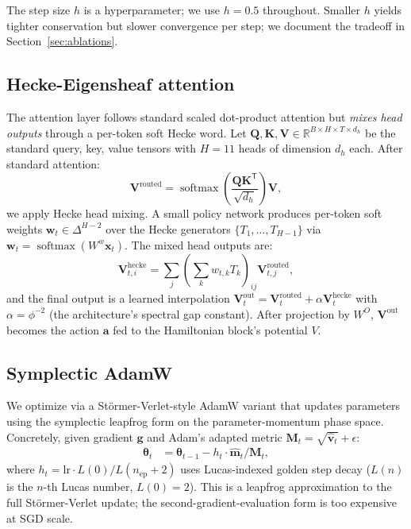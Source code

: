 \documentclass[11pt]{article}
\newcommand{\R}{\mathbb{R}}
\newcommand{\T}{\mathsf{T}}
\newcommand{\phigold}{\phi}
\DeclareMathOperator{\softmax}{softmax}
\begin{document}
The step size $h$ is a hyperparameter; we use $h = 0.5$ throughout.
Smaller $h$ yields tighter conservation but slower convergence per step;
we document the tradeoff in Section~\ref{sec:ablations}.

\subsection{Hecke-Eigensheaf attention}
\label{sec:hecke-attn}

The attention layer follows standard scaled dot-product attention but
\emph{mixes head outputs} through a per-token soft Hecke word. Let
$\bm{Q}, \bm{K}, \bm{V} \in \R^{B \times H \times T \times d_h}$ be the
standard query, key, value tensors with $H = 11$ heads of dimension
$d_h$ each. After standard attention:
\begin{equation}
\bm{V}^{\text{routed}} = \softmax\!\left(\frac{\bm{Q}\bm{K}^\T}{\sqrt{d_h}}\right) \bm{V},
\end{equation}
we apply Hecke head mixing. A small policy network produces per-token
soft weights $\bm{w}_t \in \Delta^{H-2}$ over the Hecke generators
$\{T_1, \ldots, T_{H-1}\}$ via $\bm{w}_t = \softmax(W^w \bm{x}_t)$.
The mixed head outputs are:
\begin{equation}
\bm{V}^{\text{hecke}}_{t, i} = \sum_j \left(\sum_k w_{t,k} T_k\right)_{ij} \bm{V}^{\text{routed}}_{t, j},
\label{eq:hecke-mix}
\end{equation}
and the final output is a learned interpolation
$\bm{V}^{\text{out}}_t = \bm{V}^{\text{routed}}_t + \alpha \bm{V}^{\text{hecke}}_t$
with $\alpha = \phigold^{-2}$ (the architecture's spectral gap constant).
After projection by $W^O$, $\bm{V}^{\text{out}}$ becomes the action $\bm{a}$
fed to the Hamiltonian block's potential $V$.

\subsection{Symplectic AdamW}

We optimize via a Störmer-Verlet-style AdamW variant that updates
parameters using the symplectic leapfrog form on the parameter-momentum
phase space. Concretely, given gradient $\bm{g}$ and Adam's adapted
metric $\bm{M}_t = \sqrt{\hat{\bm{v}}_t} + \epsilon$:
\begin{align}
\bm{\theta}_t &= \bm{\theta}_{t-1} - h_t \cdot \hat{\bm{m}}_t / \bm{M}_t,
\end{align}
where $h_t = \text{lr} \cdot L(0)/L(n_{\text{ep}}+2)$ uses Lucas-indexed
golden step decay ($L(n)$ is the $n$-th Lucas number, $L(0) = 2$).
This is a leapfrog approximation to the full Störmer-Verlet update;
the second-gradient-evaluation form is too expensive at SGD scale.
\end{document}

